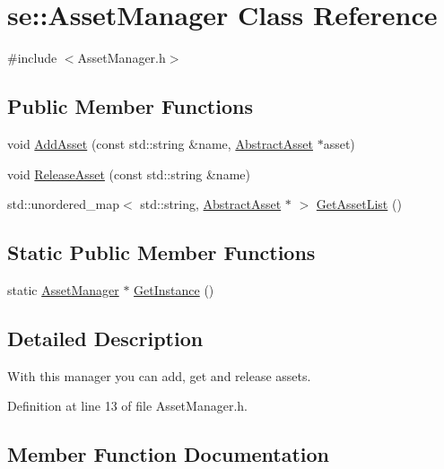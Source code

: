 \hypertarget{classse_1_1_asset_manager}{}\section{se\+:\+:Asset\+Manager Class Reference}
\label{classse_1_1_asset_manager}


{\ttfamily \#include $<$Asset\+Manager.\+h$>$}

\subsection*{Public Member Functions}
\begin{DoxyCompactItemize}
\item 
void \mbox{\hyperlink{classse_1_1_asset_manager_aee43a38dbf19e852fed3f222808277af}{Add\+Asset}} (const std\+::string \&name, \mbox{\hyperlink{classse_1_1_abstract_asset}{Abstract\+Asset}} $\ast$asset)
\item 
void \mbox{\hyperlink{classse_1_1_asset_manager_a3cd3506b7003d63adbd1cd0f94c8931e}{Release\+Asset}} (const std\+::string \&name)
\item 
std\+::unordered\+\_\+map$<$ std\+::string, \mbox{\hyperlink{classse_1_1_abstract_asset}{Abstract\+Asset}} $\ast$ $>$ \mbox{\hyperlink{classse_1_1_asset_manager_adaa14ad4d80b328f2204543d788c6a28}{Get\+Asset\+List}} ()
\end{DoxyCompactItemize}
\subsection*{Static Public Member Functions}
\begin{DoxyCompactItemize}
\item 
static \mbox{\hyperlink{classse_1_1_asset_manager}{Asset\+Manager}} $\ast$ \mbox{\hyperlink{classse_1_1_asset_manager_abcccad608538c6ddeb223c259089d468}{Get\+Instance}} ()
\end{DoxyCompactItemize}


\subsection{Detailed Description}
With this manager you can add, get and release assets. 

Definition at line 13 of file Asset\+Manager.\+h.



\subsection{Member Function Documentation}
\mbox{\label{classse_1_1_asset_manager_aee43a38dbf19e852fed3f222808277af}} 
